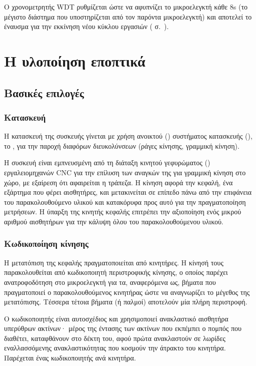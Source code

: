 Ο χρονομετρητής WDT ρυθμίζεται ώστε να αφυπνίζει το μικροελεγκτή κάθε 8s (το
μέγιστο διάστημα που υποστηρίζεται από τον παρόντα μικροελεγκτή) και αποτελεί το
έναυσμα για την εκκίνηση νέου κύκλου εργασιών
( σ.~\pageref{ssubsec:task:initiate}).


\section{Η υλοποίηση εποπτικά}


\subsection{Βασικές επιλογές}


\subsubsection{Κατασκευή}

Η κατασκευή της συσκευής γίνεται με χρήση ανοικτού ()
συστήματος κατασκευής (), το , για
την παροχή διαφόρων διευκολύνσεων (ράγες κίνησης, γραμμική κίνηση).

Η συσκευή είναι εμπνευσμένη από τη διάταξη κινητού γεφυρώματος () εργαλειομηχανών CNC για την επίλυση των αναγκών της για γραμμική κίνηση
στο χώρο, με εξαίρεση ότι αφαιρείται η τράπεζα.
Η κίνηση αφορά την κεφαλή, ένα εξάρτημα που φέρει αισθητήρες, και μετακινείται
σε επίπεδο πάνω από την επιφάνεια του παρακολουθούμενο υλικού και κατακόρυφα
προς αυτό για την πραγματοποίηση μετρήσεων. Η ύπαρξη της κινητής κεφαλής
επιτρέπει την αξιοποίηση ενός μικρού αριθμού αισθητήρων για την κάλυψη όλου του
παρακολουθούμενου υλικού.


\subsubsection{Κωδικοποίηση κίνησης}

Η μετατόπιση της κεφαλής πραγματοποιείται από κινητήρες. Η κίνησή τους
παρακολουθείται από κωδικοποιητή περιστροφικής κίνησης, ο οποίος παρέχει
ανατροφοδότηση στο μικροελεγκτή για τα, αναφερόμενα ως, βήματα που πραγματοποιεί
ο παρακολουθούμενος κινητήρας ώστε να αναγνωρίζει το μέγεθος της μετατόπισης.
Τέσσερα τέτοια βήματα (ή παλμοί) αποτελούν μία πλήρη περιστροφή.

Ο κωδικοποιητής είναι αυτοσχέδιος και χρησιμοποιεί ανακλαστικό αισθητήρα
υπερύθρων ακτίνων· μέρος της έντασης των ακτίνων που εκπέμπει ο πομπός που
διαθέτει, καταφθάνουν στο δέκτη του, αφού πρώτα ανακλαστούν σε λωρίδες
εναλλασσόμενης ανακλαστικότητας που κοσμούν την άτρακτο του κινητήρα. Παρέχεται
ένας κωδικοποιητής ανά κινητήρα.

